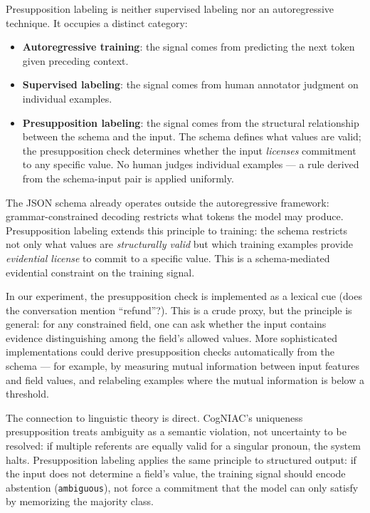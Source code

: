 \documentclass[11pt]{article}
\begin{document}
Presupposition labeling is neither supervised labeling nor an autoregressive technique. It occupies a distinct category:

\begin{itemize}
\item \textbf{Autoregressive training}: the signal comes from predicting the next token given preceding context.
\item \textbf{Supervised labeling}: the signal comes from human annotator judgment on individual examples.
\item \textbf{Presupposition labeling}: the signal comes from the structural relationship between the schema and the input. The schema defines what values are valid; the presupposition check determines whether the input \emph{licenses} commitment to any specific value. No human judges individual examples --- a rule derived from the schema-input pair is applied uniformly.
\end{itemize}

The JSON schema already operates outside the autoregressive framework: grammar-constrained decoding restricts what tokens the model may produce. Presupposition labeling extends this principle to training: the schema restricts not only what values are \emph{structurally valid} but which training examples provide \emph{evidential license} to commit to a specific value. This is a schema-mediated evidential constraint on the training signal.

In our experiment, the presupposition check is implemented as a lexical cue (does the conversation mention ``refund''?). This is a crude proxy, but the principle is general: for any constrained field, one can ask whether the input contains evidence distinguishing among the field's allowed values. More sophisticated implementations could derive presupposition checks automatically from the schema --- for example, by measuring mutual information between input features and field values, and relabeling examples where the mutual information is below a threshold.

The connection to linguistic theory is direct. CogNIAC's uniqueness presupposition \cite{baldwin1997cogniac} treats ambiguity as a semantic violation, not uncertainty to be resolved: if multiple referents are equally valid for a singular pronoun, the system halts. Presupposition labeling applies the same principle to structured output: if the input does not determine a field's value, the training signal should encode abstention (\texttt{ambiguous}), not force a commitment that the model can only satisfy by memorizing the majority class.
\end{document}
